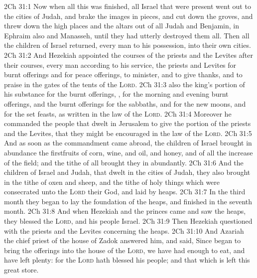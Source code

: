 \vs 2Ch 31:1 Now when all this was finished, all Israel that were present went out to the cities of Judah, and brake the images in pieces, and cut down the groves, and threw down the high places and the altars out of all Judah and Benjamin, in Ephraim also and Manasseh, until they had utterly destroyed them all. Then all the children of Israel returned, every man to his possession, into their own cities.
\vs 2Ch 31:2 And Hezekiah appointed the courses of the priests and the Levites after their courses, every man according to his service, the priests and Levites for burnt offerings and for peace offerings, to minister, and to give thanks, and to praise in the gates of the tents of the \textsc{Lord}.
\vs 2Ch 31:3  also the king's portion of his substance for the burnt offerings, , for the morning and evening burnt offerings, and the burnt offerings for the sabbaths, and for the new moons, and for the set feasts, as  written in the law of the \textsc{Lord}.
\vs 2Ch 31:4 Moreover he commanded the people that dwelt in Jerusalem to give the portion of the priests and the Levites, that they might be encouraged in the law of the \textsc{Lord}.
\vs 2Ch 31:5 And as soon as the commandment came abroad, the children of Israel brought in abundance the firstfruits of corn, wine, and oil, and honey, and of all the increase of the field; and the tithe of all  brought they in abundantly.
\vs 2Ch 31:6 And  the children of Israel and Judah, that dwelt in the cities of Judah, they also brought in the tithe of oxen and sheep, and the tithe of holy things which were consecrated unto the \textsc{Lord} their God, and laid  by heaps.
\vs 2Ch 31:7 In the third month they began to lay the foundation of the heaps, and finished  in the seventh month.
\vs 2Ch 31:8 And when Hezekiah and the princes came and saw the heaps, they blessed the \textsc{Lord}, and his people Israel.
\vs 2Ch 31:9 Then Hezekiah questioned with the priests and the Levites concerning the heaps.
\vs 2Ch 31:10 And Azariah the chief priest of the house of Zadok answered him, and said, Since  began to bring the offerings into the house of the \textsc{Lord}, we have had enough to eat, and have left plenty: for the \textsc{Lord} hath blessed his people; and that which is left  this great store.
